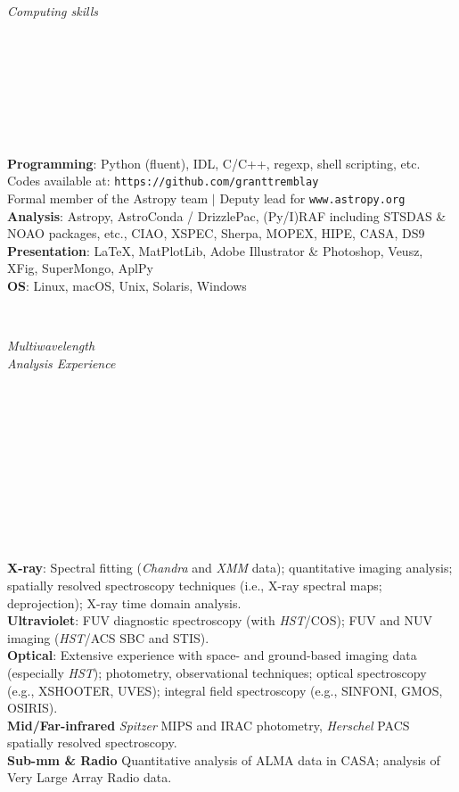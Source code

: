 \documentclass[11pt]{article}
\begin{document}
\hspace{2.5mm} \parbox{1.5in}{\textit{Computing skills \\\\\\\\\\\\\\\\}}
\parbox{5.15in}{
\textbf{Programming}: Python (fluent), IDL, C/C++, regexp, shell scripting, etc. \\ Codes available at: {\small \texttt{https://github.com/granttremblay}}\\
Formal member of the Astropy team $|$ Deputy lead for \texttt{www.astropy.org} \\
\textbf{Analysis}: Astropy, AstroConda / DrizzlePac, (Py/I)RAF including STSDAS \& NOAO packages, etc., CIAO, XSPEC, Sherpa, MOPEX, HIPE, CASA, DS9 \\
\textbf{Presentation}:  \LaTeX, MatPlotLib, Adobe Illustrator \& Photoshop, Veusz, XFig, SuperMongo, AplPy \\
\textbf{OS}: Linux, macOS, Unix, Solaris, Windows\\
}\\

\hspace{2.5mm} \parbox{1.5in}{\textit{Multiwavelength \\ Analysis Experience \\\\\\\\\\\\\\\\\\\\\\}} \parbox{5.15in}{
\textbf{X-ray}: Spectral fitting (\textit{Chandra} and \textit{XMM} data); quantitative imaging analysis; spatially resolved spectroscopy techniques (i.e., X-ray spectral maps; deprojection); X-ray time domain analysis. \\
\textbf{Ultraviolet}: FUV diagnostic spectroscopy (with \textit{HST}/COS); FUV and NUV imaging (\textit{HST}/ACS SBC and STIS). \\
\textbf{Optical}: Extensive experience with space- and ground-based imaging data (especially \textit{HST}); photometry, observational techniques; optical spectroscopy (e.g., XSHOOTER, UVES);  integral field spectroscopy (e.g., SINFONI, GMOS, OSIRIS). \\
\textbf{Mid/Far-infrared} \textit{Spitzer} MIPS and IRAC photometry, \textit{Herschel} PACS spatially resolved spectroscopy.  \\
\textbf{Sub-mm \& Radio} Quantitative analysis of ALMA data in CASA; analysis of Very Large Array Radio data.  \\
}\\
\end{document}
